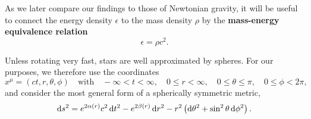 As we later compare our findings to those of Newtonian gravity, it will be useful to connect the energy density $\epsilon$ to the mass density $\rho$ by the \textbf{mass-energy equivalence relation}
\begin{equation}
	\epsilon = \rho c^2 .
	\label{eq:tov:mass_energy_equivalence}
\end{equation}

Unless rotating very fast, stars are well approximated by spheres.
For our purposes, we therefore use the coordinates
\begin{equation}
	x^\mu = (c t, r, \theta, \phi)
	\quad \text{with} \quad
	-\infty < t < \infty, \quad
	0 \leq r < \infty, \quad
	0 \leq \theta \leq \pi, \quad
	0 \leq \phi < 2 \pi ,
\end{equation}
and consider the most general form of a spherically symmetric metric, \cite[equation 5.11]{ref:carroll}
\begin{equation}
	\mathop{}\!\mathrm{d} s^2 = e^{2 \alpha(r)} c^2 \mathop{}\!\mathrm{d} t^2 - e^{2 \beta(r)} \mathop{}\!\mathrm{d} r^2 - r^2 \left( \mathop{}\!\mathrm{d} \theta^2 + \sin^2 \theta \mathop{}\!\mathrm{d} \phi^2 \right) .
\label{eq:tov:metric}
\end{equation}

